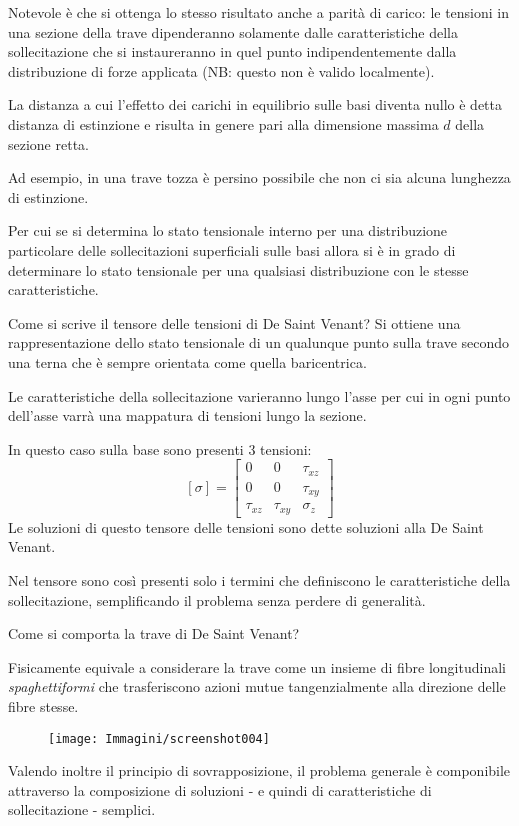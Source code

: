 \documentclass{article}
\begin{document}
\begin{adjustwidth}{2in}{}
	Notevole è che si ottenga lo stesso risultato anche a parità di carico: le tensioni in una sezione della trave dipenderanno solamente dalle caratteristiche della sollecitazione che si instaureranno in quel punto indipendentemente dalla distribuzione di forze applicata (NB: questo non è valido localmente).\newline
	
	La distanza a cui l’effetto dei carichi in equilibrio sulle basi diventa nullo è detta distanza di estinzione e risulta in genere pari alla dimensione massima $ d $ della sezione retta.
	
	Ad esempio, in una trave tozza è persino possibile che non ci sia alcuna lunghezza di estinzione.  \newline 
	
	Per cui se si determina lo stato tensionale interno per una distribuzione particolare delle sollecitazioni superficiali
	sulle basi allora si è in grado di determinare lo stato tensionale per una qualsiasi distribuzione con le
	stesse caratteristiche. \newline 
	
	Come si scrive il tensore delle tensioni di De Saint Venant? Si ottiene una rappresentazione dello stato tensionale di un qualunque punto sulla trave secondo una terna che è sempre orientata come quella baricentrica. 
	
	Le caratteristiche della sollecitazione varieranno lungo l'asse per cui in ogni punto dell'asse varrà una mappatura di tensioni lungo la sezione. \newline	
	 
	In questo caso sulla base sono presenti 3 tensioni: 
	\[ [\sigma] = \left[ \begin{array}{ccc}
		0 & 0 & \tau_{xz} \\
		0 & 0 & \tau_{xy} \\
		\tau_{xz} & \tau_{xy} & \sigma_z
	\end{array}\right] \]
	Le soluzioni di questo tensore delle tensioni sono dette soluzioni alla De Saint Venant. \newline 
	
	Nel tensore sono così presenti solo i termini che definiscono le caratteristiche della sollecitazione, semplificando
	il problema senza perdere di generalità. \newline
	
	Come si comporta la trave di De Saint Venant?
	
	Fisicamente equivale a considerare la trave come un insieme di fibre longitudinali \textit{spaghettiformi} che trasferiscono
	azioni mutue tangenzialmente alla direzione delle fibre stesse.  
	\begin{figure}[H]
		\centering
		\texttt{[image: Immagini/screenshot004]}
		\label{fig:screenshot004}
	\end{figure}	
	Valendo inoltre il principio di sovrapposizione, il problema generale è componibile attraverso la composizione di soluzioni - e quindi di caratteristiche di sollecitazione - semplici. 
	

\end{adjustwidth}
\end{document}
